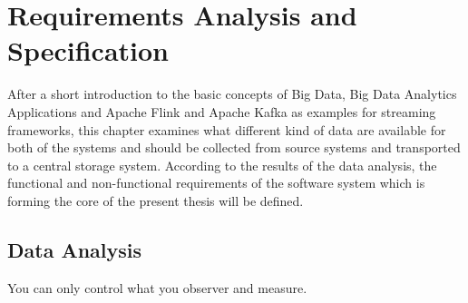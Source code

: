 \chapter{Requirements Analysis and Specification}

After a short introduction to the basic concepts of Big Data, Big Data Analytics Applications
and Apache Flink and Apache Kafka as examples for streaming frameworks, this chapter
examines what different kind of data are available for both of the systems and should be collected from source systems and
transported to a central storage system. According to the results of the data analysis, the
functional and non-functional requirements of the software system which is forming the core of
the present thesis will be defined.

\section{Data Analysis}

You can only control what you observer and measure.

%
%
%
%
%

